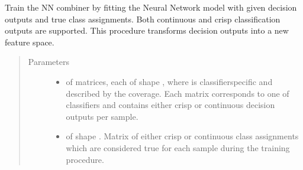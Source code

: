 \documentclass[letterpaper,10pt,english]{sphinxmanual}
\begin{document}
\begin{fulllineitems}
\begin{fulllineitems}
\label{\detokenize{pusion.core.neural_network_combiner:pusion.core.neural_network_combiner.CRNeuralNetworkCombiner.train}}
\sphinxAtStartPar
Train the NN combiner by fitting the Neural Network model with given decision outputs and
true class assignments. Both continuous and crisp classification outputs are supported.
This procedure transforms decision outputs into a new feature space.
\begin{quote}\begin{description}
\item[{Parameters}] \leavevmode\begin{itemize}
\item {} 
\sphinxAtStartPar
{} \textendash{}  of  matrices, each of shape ,
where  is classifier\sphinxhyphen{}specific and described by the coverage.
Each matrix corresponds to one of  classifiers and contains either crisp or continuous
decision outputs per sample.

\item {} 
\sphinxAtStartPar
{} \textendash{}  of shape .
Matrix of either crisp or continuous class assignments which are considered true for each sample during
the training procedure.

\end{itemize}

\end{description}\end{quote}

\end{fulllineitems}



\end{fulllineitems}
\end{document}
